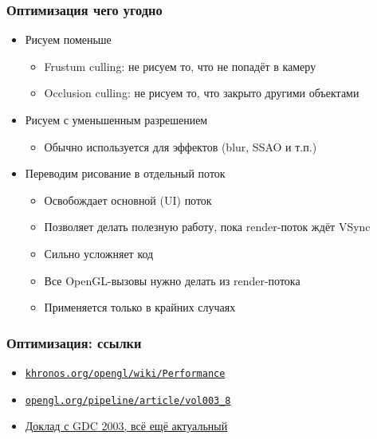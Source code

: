 \documentclass{beamer}
\begin{document}
\begin{frame}[fragile]
\frametitle{Оптимизация чего угодно}
\begin{itemize}
\item Рисуем поменьше
\begin{itemize}
\item Frustum culling: не рисуем то, что не попадёт в камеру
\pause
\item Occlusion culling: не рисуем то, что закрыто другими объектами
\end{itemize}
\pause
\item Рисуем с уменьшенным разрешением
\begin{itemize}
\item Обычно используется для эффектов (blur, SSAO и т.п.)
\end{itemize}
\pause
\item Переводим рисование в отдельный поток
\begin{itemize}
\item Освобождает основной (UI) поток
\pause
\item Позволяет делать полезную работу, пока render-поток ждёт VSync
\pause
\item Сильно усложняет код
\pause
\item Все OpenGL-вызовы нужно делать из render-потока
\pause
\item Применяется только в крайних случаях
\end{itemize}
\end{itemize}
\end{frame}

\begin{frame}[fragile]
\frametitle{Оптимизация: ссылки}
\begin{itemize}
\item \href{https://www.khronos.org/opengl/wiki/Performance}{\nolinkurl{khronos.org/opengl/wiki/Performance}}
\item \href{https://www.opengl.org/pipeline/article/vol003_8}{\nolinkurl{opengl.org/pipeline/article/vol003\_8}}
\item \href{https://www.nvidia.com/docs/IO/8230/GDC2003_OGL_Performance.pdf}{Доклад с GDC 2003, всё ещё актуальный}
\end{itemize}
\end{frame}
\end{document}
